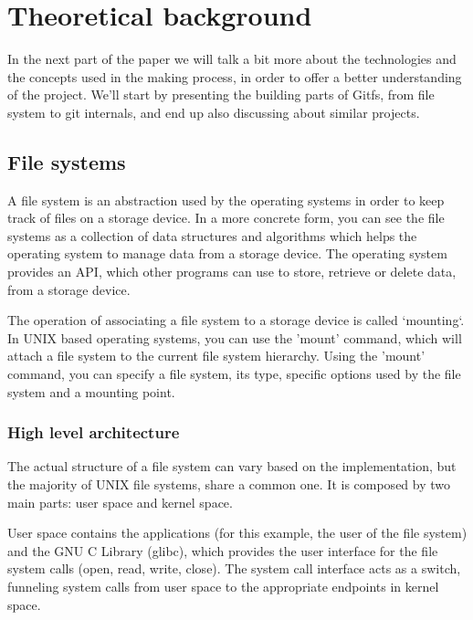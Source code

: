 \chapter{Theoretical background}

\label{ch:theoretical}
In the next part of the paper we will talk a bit more about the technologies and the concepts used in the making process, in order to offer a better understanding of the project. We'll start by presenting the building parts of Gitfs, from file system to git internals, and end up also discussing about similar projects.

\section{File systems}
    A file system is an abstraction used by the operating systems in order to keep track of files on a storage device. In a more concrete form, you can see the file systems as a collection of data structures and algorithms which helps the operating system to manage data from a storage device. The operating system provides an API, which other programs can use to store, retrieve or delete data, from a storage device.

    The operation of associating a file system to a storage device is called `mounting`. In UNIX based operating systems, you can use the 'mount' command, which will attach a file system to the current file system hierarchy. Using the 'mount' command, you can specify a file system, its type, specific options used by the file system and a mounting point.

    \subsection{High level architecture}
        The actual structure of a file system can vary based on the implementation, but the majority of UNIX file systems, share a common one. It is composed by two main parts: user space and kernel space.

        User space contains the applications (for this example, the user of the file system) and the GNU C Library (glibc), which provides the user interface for the file system calls (open, read, write, close). The system call interface acts as a switch, funneling system calls from user space to the appropriate endpoints in kernel space.

